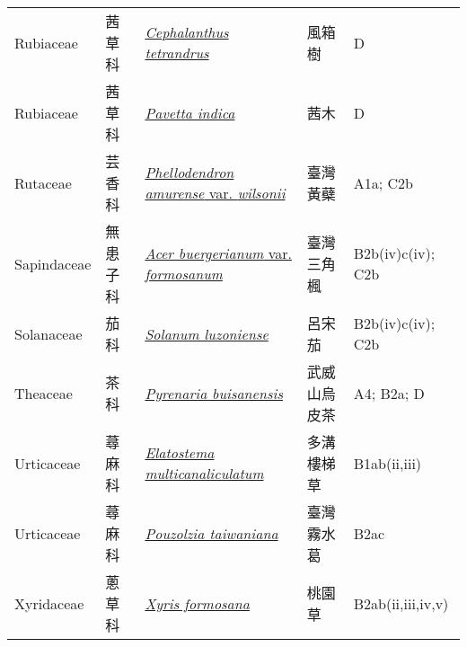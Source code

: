 {\begin{longtable}{p{2.5cm}p{2.5cm}p{4.5cm}p{2.5cm}p{3cm}}
    Rubiaceae & 茜草科 & \href{http://www.theplantlist.org/tpl1.1/search?q=Cephalanthus+tetrandrus}{\textit{Cephalanthus tetrandrus} } & 風箱樹 & D \index{Cephalanthus@\textit{Cephalanthus}!tetrandrus@\textit{tetrandrus}}  \index{風箱樹} \\
    Rubiaceae & 茜草科 & \href{http://www.theplantlist.org/tpl1.1/search?q=Pavetta+indica}{\textit{Pavetta indica} } & 茜木 & D \index{Pavetta@\textit{Pavetta}!indica@\textit{indica}}  \index{茜木} \\
    Rutaceae & 芸香科 & \href{http://www.theplantlist.org/tpl1.1/search?q=Phellodendron+amurense+var.+wilsonii}{\textit{Phellodendron amurense} var. \textit{wilsonii} } & 臺灣黃蘗 & A1a; C2b \index{Phellodendron@\textit{Phellodendron}!amurense@\textit{amurense}!var. wilsonii@var. \textit{wilsonii}}  \index{臺灣黃蘗} \\
    Sapindaceae & 無患子科 & \href{http://www.theplantlist.org/tpl1.1/search?q=Acer+buergerianum+var.+formosanum}{\textit{Acer buergerianum} var. \textit{formosanum} } & 臺灣三角楓 & B2b(iv)c(iv); C2b \index{Acer@\textit{Acer}!buergerianum@\textit{buergerianum}!var. formosanum@var. \textit{formosanum}}  \index{臺灣三角楓} \\
    Solanaceae & 茄科 & \href{http://www.theplantlist.org/tpl1.1/search?q=Solanum+luzoniense}{\textit{Solanum luzoniense} } & 呂宋茄 & B2b(iv)c(iv); C2b \index{Solanum@\textit{Solanum}!luzoniense@\textit{luzoniense}}  \index{呂宋茄} \\
    Theaceae & 茶科 & \href{http://www.theplantlist.org/tpl1.1/search?q=Pyrenaria+buisanensis}{\textit{Pyrenaria buisanensis} } & 武威山烏皮茶 & A4; B2a; D \index{Pyrenaria@\textit{Pyrenaria}!buisanensis@\textit{buisanensis}}  \index{武威山烏皮茶} \\
    Urticaceae & 蕁麻科 & \href{http://www.theplantlist.org/tpl1.1/search?q=Elatostema+multicanaliculatum}{\textit{Elatostema multicanaliculatum} } & 多溝樓梯草 & B1ab(ii,iii) \index{Elatostema@\textit{Elatostema}!multicanaliculatum@\textit{multicanaliculatum}}  \index{多溝樓梯草} \\
    Urticaceae & 蕁麻科 & \href{http://www.theplantlist.org/tpl1.1/search?q=Pouzolzia+taiwaniana}{\textit{Pouzolzia taiwaniana} } & 臺灣霧水葛 & B2ac \index{Pouzolzia@\textit{Pouzolzia}!taiwaniana@\textit{taiwaniana}}  \index{臺灣霧水葛} \\
    Xyridaceae & 蔥草科 & \href{http://www.theplantlist.org/tpl1.1/search?q=Xyris+formosana}{\textit{Xyris formosana} } & 桃園草 & B2ab(ii,iii,iv,v) \index{Xyris@\textit{Xyris}!formosana@\textit{formosana}}  \index{桃園草} \\
    \bottomrule
        \end{longtable}
        }
    